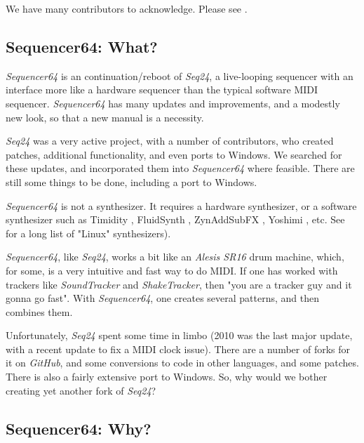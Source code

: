 \documentclass[
 11pt,
 twoside,
 a4paper,
 headinclude,
 footinclude,
 final                                 %
]{article}
\begin{document}
   We have many contributors to acknowledge.  Please see
   .

\subsection{Sequencer64: What?}
\label{subsec:what_is_sequencer64}

   \textsl{Sequencer64} is an continuation/reboot of \textsl{Seq24},
   a live-looping sequencer with an interface more like a hardware sequencer
   than the typical software MIDI sequencer.
   \textsl{Sequencer64} has many updates and improvements, and a modestly
   new look, so that a new manual is a necessity.

   \textsl{Seq24} was a very active project, with a
   number of contributors, who created patches, additional
   functionality, and even ports to Windows.
   We searched for these updates, and
   incorporated them into \textsl{Sequencer64} where feasible.
   There are still some things to be done, including a port to
   Windows.

   \textsl{Sequencer64} is not a synthesizer.  It requires a hardware
   synthesizer, or a software synthesizer such as Timidity \cite{timidity},
   FluidSynth \cite{fluidsynth}, ZynAddSubFX \cite{zynaddsubfx}, Yoshimi
   \cite{yoshimi} \cite{yoshimi2}, etc.
   See \cite{linuxsynths} for a long
   list of "Linux" synthesizers).

   \textsl{Sequencer64}, like \textsl{Seq24},
   works a bit like an \textsl{Alesis SR16} drum machine,
   which, for some, is a very intuitive and fast way to do MIDI.
   If one has worked with trackers like \textsl{SoundTracker} and
   \textsl{ShakeTracker}, then "you are a tracker guy and it gonna go fast".
   With \textsl{Sequencer64}, one creates several patterns, and then
   combines them.

   Unfortunately, \textsl{Seq24} spent some time in limbo
   (2010 was the last major update, with a
   recent update to fix a MIDI clock issue).  There are a number of
   forks for it on \textsl{GitHub}, and some conversions
   to code in other languages, and some patches.
   There is also a fairly extensive port to Windows.
   So, why would we bother creating yet another fork of \textsl{Seq24}?

\subsection{Sequencer64: Why?}
\label{subsec:introduction_seq64_vs_others}
\end{document}
